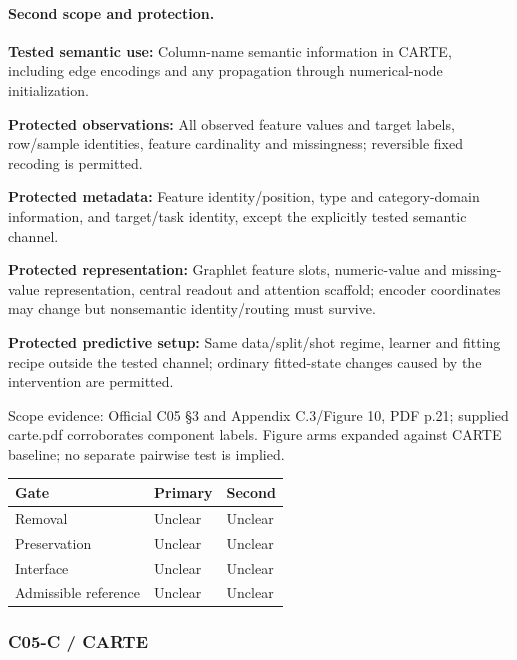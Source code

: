 \documentclass[10pt]{article}
\begin{document}
\paragraph{Second scope and protection.}
\textbf{Tested semantic use:} Column-name semantic information in CARTE, including edge encodings and any propagation through numerical-node initialization.\par
\textbf{Protected observations:} All observed feature values and target labels, row/sample identities, feature cardinality and missingness; reversible fixed recoding is permitted.\par
\textbf{Protected metadata:} Feature identity/position, type and category-domain information, and target/task identity, except the explicitly tested semantic channel.\par
\textbf{Protected representation:} Graphlet feature slots, numeric-value and missing-value representation, central readout and attention scaffold; encoder coordinates may change but nonsemantic identity/routing must survive.\par
\textbf{Protected predictive setup:} Same data/split/shot regime, learner and fitting recipe outside the tested channel; ordinary fitted-state changes caused by the intervention are permitted.\par
Scope evidence: Official C05 §3 and Appendix C.3/Figure 10, PDF p.21; supplied carte.pdf corroborates component labels. Figure arms expanded against CARTE baseline; no separate pairwise test is implied.\par
\begin{tabular}{lll}\toprule Gate & Primary & Second \\ \midrule
Removal & Unclear & Unclear \\
Preservation & Unclear & Unclear \\
Interface & Unclear & Unclear \\
Admissible reference & Unclear & Unclear \\
\bottomrule\end{tabular}
\subsubsection*{C05-C / CARTE}
\end{document}
